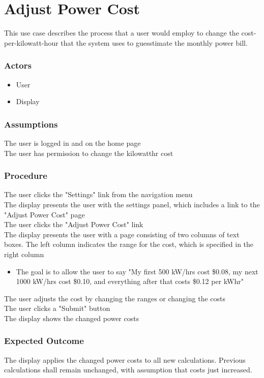 \section{Adjust Power Cost}
This use case describes the process that a user would employ to change the cost-per-kilowatt-hour that the system uses to guesstimate the monthly power bill.

\subsubsection{Actors}
\begin{itemize}
	\item User
	\item Display
\end{itemize}

\subsubsection{Assumptions}

The user is logged in and on the home page\\
The user has permission to change the kilowatt\/hr cost 

\subsubsection{Procedure}

The user clicks the "Settings" link from the navigation menu\\
The display presents the user with the settings panel, which includes a link to the "Adjust Power Cost" page\\
The user clicks the "Adjust Power Cost" link\\
The display presents the user with a page consisting of two columns of text boxes. The left column indicates the range for the cost, which is specified in the right column\\
\begin{itemize}
	\item The goal is to allow the user to say "My first 500 kW/hrs cost \$0.08, my next 1000 kW/hrs cost \$0.10, and everything after that costs \$0.12 per kW\/hr" 
\end{itemize}
The user adjusts the cost by changing the ranges or changing the costs\\
The user clicks a "Submit" button\\
The display shows the changed power costs

\subsubsection{Expected Outcome}

The display applies the changed power costs to all new calculations. 
Previous calculations shall remain unchanged, with assumption that costs just increased.